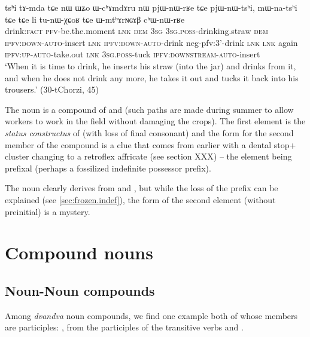 \begin{exe}
\ex \label{ex:WmthArNGAB}
\gll tsʰi tɤ-mda tɕe nɯ ɯʑo ɯ-cʰɤmdɤru nɯ pjɯ-nɯ-rʁe tɕe pjɯ-nɯ-tsʰi, mɯ-na-tsʰi tɕe tɕe li tu-nɯ-χɕoʁ tɕe ɯ-mtʰɤrɴɢɤβ cʰɯ-nɯ-rʁe \\
drink:\textsc{fact} \textsc{pfv}-be.the.moment \textsc{lnk} \textsc{dem} \textsc{3sg} \textsc{3sg.poss}-drinking.straw \textsc{dem} \textsc{ipfv}:\textsc{down}-\textsc{auto}-insert \textsc{lnk} \textsc{ipfv}:\textsc{down}-\textsc{auto}-drink neg-pfv:3'-drink \textsc{lnk} \textsc{lnk} again \textsc{ipfv}:\textsc{up}-\textsc{auto}-take.out \textsc{lnk} \textsc{3sg.poss}-tuck \textsc{ipfv}:\textsc{downstream}-\textsc{auto}-insert \\
\glt `When it is time to drink, he inserts his straw (into the jar) and drinks from it, and when he does not drink any more, he takes it out and tucks it back into his trousers.' (30-tChorzi, 45)
\end{exe}

The noun  is a compound of  and  (such paths are made during summer to allow workers to work in the field without damaging the crops). The first element  is the \textit{status constructus} of  (with loss of final consonant) and the form  for the second member of the compound is a clue that  comes from earlier  with a dental stop+ cluster changing to a retroflex affricate (see section XXX) -- the  element being prefixal (perhaps a fossilized indefinite possessor prefix).

The noun  clearly derives from  and , but while the loss of the  prefix can be explained (see \ref{sec:frozen.indef}), the form of the second element (without  preinitial) is a mystery.
 

\section{Compound nouns}
\subsection{Noun-Noun compounds} \label{sec.n.n.compounds}

Among \textit{dvandva} noun compounds, we find one example both of whose members are participles: , from the  participles of the transitive verbs  and  .

